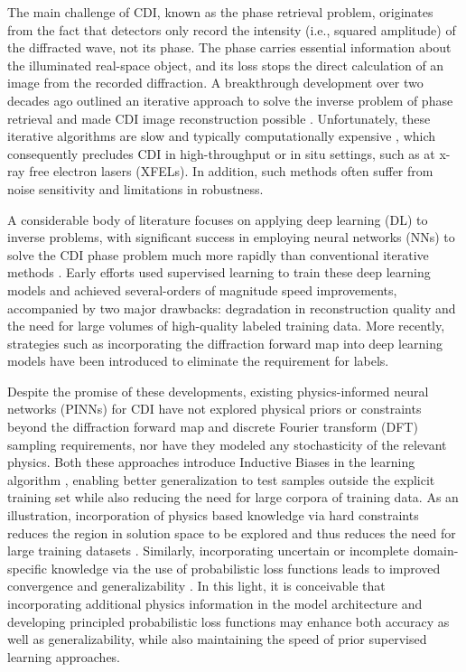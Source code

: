 \documentclass[sn-mathphys]{sn-jnl}%
\theoremstyle{thmstyleone}%
\theoremstyle{thmstyletwo}%
\theoremstyle{thmstylethree}%
\begin{document}
The main challenge of CDI, known as the phase retrieval problem, originates from the fact that detectors only record the intensity (i.e., squared amplitude) of the diffracted wave, not its phase. The phase carries essential information about the illuminated real-space object, and its loss stops the direct calculation of an image from the recorded diffraction. A breakthrough development over two decades ago outlined an iterative approach to solve the inverse problem of phase retrieval and made CDI image reconstruction possible \cite{miao1999extending}. Unfortunately, these iterative algorithms are slow and typically computationally expensive \cite{epie}, which consequently precludes CDI in high-throughput or in situ settings, such as at x-ray free electron lasers (XFELs). In addition, such methods often suffer from noise sensitivity and limitations in robustness.

A considerable body of literature focuses on applying deep learning (DL) to inverse problems, with significant success in employing neural networks (NNs) to solve the CDI phase problem much more rapidly than conventional iterative methods \cite{ratner2021recovering,yao2022autophasenn,chang2023deep}. Early efforts used supervised learning to train these deep learning models and achieved several-orders of magnitude speed improvements, accompanied by two major drawbacks: degradation in reconstruction quality and the need for large volumes of high-quality labeled training data. More recently, strategies such as incorporating the diffraction forward map into deep learning models have been introduced to eliminate the requirement for labels. 

Despite the promise of these developments, existing physics-informed neural networks (PINNs) for CDI have not explored physical priors or constraints beyond the diffraction forward map and discrete Fourier transform (DFT) sampling requirements, nor have they modeled any stochasticity of the relevant physics. Both these approaches introduce Inductive Biases in the learning algorithm \cite{mitchell1980need, baxter2000model}, enabling better generalization to test samples outside the explicit training set while also reducing the need for large corpora of training data. As an illustration, incorporation of physics based knowledge via hard constraints reduces the region in solution space to be explored and thus reduces the need for large training datasets \cite{baker2019workshop}. Similarly, incorporating uncertain or incomplete domain-specific knowledge via the use of probabilistic loss functions leads to improved convergence and generalizability \cite{baker2019workshop}. In this light, it is conceivable that incorporating additional physics information in the model architecture and developing principled probabilistic loss functions may enhance both accuracy as well as generalizability, while also maintaining the speed of prior supervised learning approaches. 
\end{document}
